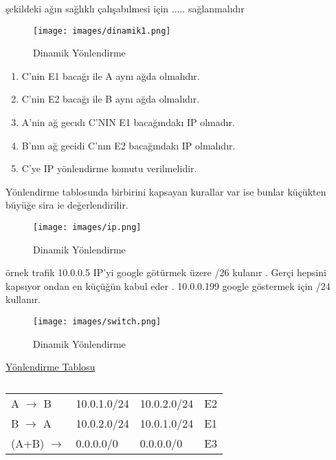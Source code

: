 şekildeki ağın sağlıklı çalışabılmesi için  ..... sağlanmalıdır\\
\begin{figure}[ht]
    \centering
    \texttt{[image: images/dinamik1.png]}
    \caption{Dinamik Yönlendirme}
    \label{fig:bandwidth_example}
\end{figure}
\begin{enumerate}
   \item C'nin E1 bacağı ile A aynı ağda olmalıdır.
   \item  C'nin E2 bacağı ile B aynı ağda olmalıdır.
   \item  A'nin ağ gecıdı C'NIN E1 bacağındakı IP olmadır.
   \item  B'nın ağ gecidi C'nın E2 bacağındakı IP olmalıdır.
   \item C'ye IP yönlendirme komutu verilmelidir.
\end{enumerate}

Yönlendirme  tablosunda  birbirini kapsayan kurallar var ise bunlar küçükten büyüğe sira ie değerlendirilir.\\

\begin{figure}[ht]
    \centering
    \texttt{[image: images/ip.png]}
    \caption{Dinamik Yönlendirme}
    \label{fig:bandwidth_example}
\end{figure}

örnek trafik 10.0.0.5 IP'yi google götürmek üzere /26 kulanır . Gerçi hepsini kapsıyor ondan en küçüğün kabul eder . 10.0.0.199 google göstermek için /24 kullanır.\\

\begin{figure}[ht]
    \centering
    \texttt{[image: images/switch.png]}
    \caption{Dinamik Yönlendirme}
    \label{fig:bandwidth_example}
\end{figure}

\begin{center}
 \underline{Yönlendirme Tablosu}
\end{center}
\begin{table}[h]
   \centering
   
   \begin{tabular}{llll}
   A $\rightarrow$ B & 10.0.1.0/24 & 10.0.2.0/24 & E2\\
   B $\rightarrow$ A & 10.0.2.0/24 & 10.0.1.0/24 & E1\\
   (A+B)    $\rightarrow$  & 0.0.0.0/0 & 0.0.0.0/0 & E3
  \end{tabular}
  \caption{}    
\end{table}

